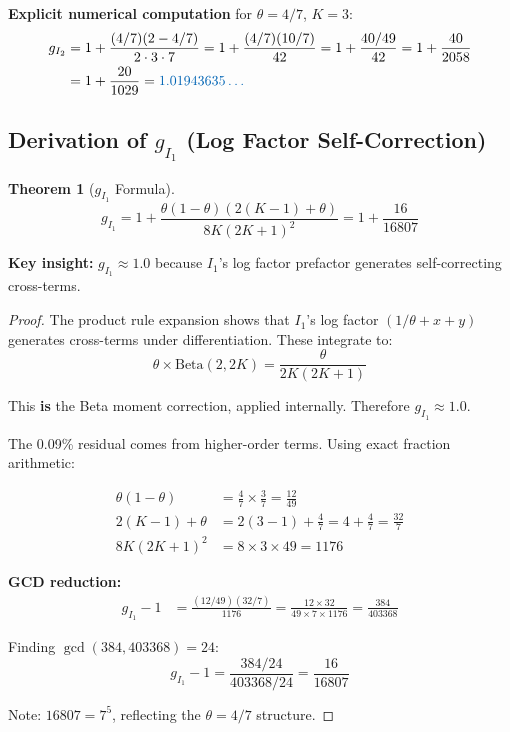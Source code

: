 \documentclass[11pt]{article}
\newtheorem{theorem}{Theorem}
\begin{document}
\textbf{Explicit numerical computation} for $\theta=4/7$, $K=3$:
\begin{align}
g_{I_2} &= 1 + \frac{(4/7)(2 - 4/7)}{2 \cdot 3 \cdot 7} = 1 + \frac{(4/7)(10/7)}{42} = 1 + \frac{40/49}{42} = 1 + \frac{40}{2058} \\
&= 1 + \frac{20}{1029} = \textcolor{derived}{1.01943635\ldots}
\end{align}

\subsection{Derivation of $g_{I_1}$ (Log Factor Self-Correction)}

\begin{theorem}[$g_{I_1}$ Formula]
\begin{equation}
\boxed{g_{I_1} = 1 + \frac{\theta(1-\theta)(2(K-1)+\theta)}{8K(2K+1)^2} = 1 + \frac{16}{16807}}
\end{equation}
\end{theorem}

\textbf{Key insight:} $g_{I_1} \approx 1.0$ because $I_1$'s log factor prefactor generates self-correcting cross-terms.

\begin{proof}
The product rule expansion shows that $I_1$'s log factor $(1/\theta + x + y)$ generates cross-terms under differentiation. These integrate to:
\begin{equation}
\theta \times \text{Beta}(2, 2K) = \frac{\theta}{2K(2K+1)}
\end{equation}

This \textbf{is} the Beta moment correction, applied internally. Therefore $g_{I_1} \approx 1.0$.

The 0.09\% residual comes from higher-order terms. Using exact fraction arithmetic:

\begin{align}
\theta(1-\theta) &= \frac{4}{7} \times \frac{3}{7} = \frac{12}{49} \\
2(K-1) + \theta &= 2(3-1) + \frac{4}{7} = 4 + \frac{4}{7} = \frac{32}{7} \\
8K(2K+1)^2 &= 8 \times 3 \times 49 = 1176
\end{align}

\textbf{GCD reduction:}
\begin{align}
g_{I_1} - 1 &= \frac{(12/49)(32/7)}{1176} = \frac{12 \times 32}{49 \times 7 \times 1176} = \frac{384}{403368}
\end{align}

Finding $\gcd(384, 403368) = 24$:
\begin{equation}
g_{I_1} - 1 = \frac{384/24}{403368/24} = \frac{16}{16807}
\end{equation}

Note: $16807 = 7^5$, reflecting the $\theta = 4/7$ structure.
\end{proof}
\end{document}
